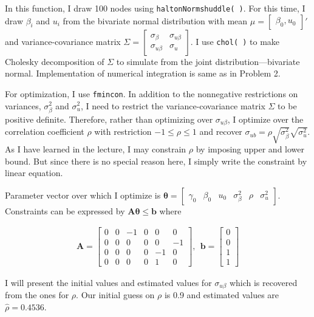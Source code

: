 \documentclass[11pt,letter]{article}
\newcommand{\vect}[1]{\boldsymbol{\mathbf{#1}}}
\newcounter{lem}[section] \setcounter{lem}{0}
\newcommand{\bmat}[1]{\begin{bmatrix} #1 \end{bmatrix}}%
\newcommand{\code}[1]{\texttt{#1}}
\begin{document}
In this function, I draw 100 nodes using \code{haltonNormshuddle( )}. For this time, I draw $\beta_i$ and $u_i$ from the bivariate normal distribution with mean $\mu=\bmat{\beta_0, u_0}'$ and variance-covariance matrix $\Sigma = \bmat{\sigma_\beta & \sigma_{u\beta} \\ \sigma_{u\beta} & \sigma_{u}}$. I use \code{chol( )} to make Cholesky decomposition of $\Sigma$ to simulate from the joint distribution---bivariate normal. Implementation of numerical integration is same as in Problem 2.

For optimization, I use \code{fmincon}. In addition to the nonnegative restrictions on variances, $\sigma_\beta^2$ and $\sigma_u^2$, I need to restrict the variance-covariance matrix $\Sigma$ to be positive definite. Therefore, rather than optimizing over $\sigma_{u\beta}$, I optimize over the correlation coefficient $\rho$ with restriction $-1\leq\rho\leq1$ and recover $\sigma_{ub} = \rho \sqrt{\sigma_\beta^2}\sqrt{\sigma_u^2}$. As I have learned in the lecture, I may constrain $\rho$ by imposing upper and lower bound. But since there is no special reason here, I simply write the constraint by linear equation.

Parameter vector over which I optimize is $\vect{\theta}=\bmat{\gamma_0 & \beta_0 & u_0 & \sigma_\beta^2 & \rho & \sigma_u^2 }$. Constraints can be expressed by $\vect{A}\vect{\theta}\leq\vect{b}$ where

\begin{align*}
\vect{A} = \bmat{ 	0 & 0 & -1 & 0 & 0 & 0 \\
						0 & 0 &  0 & 0 & 0 & -1 \\
						0 & 0 &  0 & 0 & -1 & 0 \\
						0 & 0 &  0 & 0 & 1 & 0 },\ \ 
\vect{b} = \bmat{0\\ 0 \\ 1 \\ 1 }
\end{align*}

I will present the initial values and estimated values for $\sigma_{u\beta}$ which is recovered from the ones for $\rho$. Our initial guess on $\rho$ is 0.9 and estimated values are $\hat{\rho} = 0.4536$.
\end{document}
